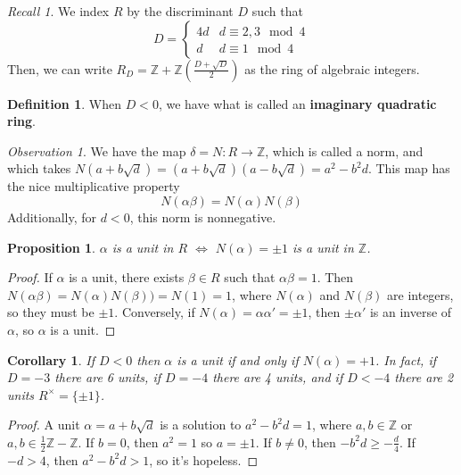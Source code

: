 \documentclass[12pt]{article}
\newtheorem{cor}[thm]{Corollary}
\newtheorem{prop}[thm]{Proposition}
\theoremstyle{definition}
\newtheorem{defn}[thm]{Definition}
\theoremstyle{remark}
\newtheorem{obs}[thm]{Observation}
\newtheorem*{rec}{Recall}
\numberwithin{equation}{section}
\newcommand\Z{\mathbb Z}    %
\newcommand\B[1]{\textbf{ #1}}
\begin{document}
\vspace{15pt}

\begin{rec}
        We index $R$ by the discriminant $D$ such that \begin{equation}
                D = \left\{\begin{array}{cc} 4d & d \equiv 2,3 \mod 4 \\ d & d \equiv 1 \mod 4 \end{array}\right.
        \end{equation}
        Then, we can write $R_D = \Z + \Z\left(\frac{D+\sqrt{D}}{2}\right)$ as the ring of algebraic integers.
\end{rec}

\vspace{15pt}

\begin{defn}
        When $D<0$, we have what is called an \B{imaginary quadratic ring}.
\end{defn}

\vspace{15pt}

\begin{obs}
        We have the map $\delta = N:R\rightarrow \Z$, which is called a norm, and which takes $N(a+b\sqrt{d}) = (a+b\sqrt{d})(a-b\sqrt{d}) = a^2-b^2d$. This map has the nice multiplicative property \begin{equation}
                N(\alpha\beta)=N(\alpha)N(\beta)
        \end{equation}
        Additionally, for $d < 0$, this norm is nonnegative.
\end{obs}

\vspace{15pt}

\begin{prop}
        $\alpha$ is a unit in $R$ $\iff$ $N(\alpha) = \pm 1$ is a unit in $\Z$.
\end{prop}
\begin{proof}
        If $\alpha$ is a unit, there exists $\beta \in R$ such that $\alpha\beta = 1$. Then $N(\alpha\beta) = N(\alpha)N(\beta)) = N(1) = 1$, where $N(\alpha)$ and $N(\beta)$ are integers, so they must be $\pm 1$. Conversely, if $N(\alpha) = \alpha\alpha' = \pm 1$, then $\pm \alpha'$ is an inverse of $\alpha$, so $\alpha$ is a unit. 
\end{proof}

\vspace{15pt}

\begin{cor}
        If $D < 0$ then $\alpha$ is a unit if and only if $N(\alpha) = +1$. In fact, if $D = -3$ there are 6 units, if $D = -4$ there are 4 units, and if $D < -4$ there are 2 units $R^{\times} = \{\pm 1\}$.
\end{cor}
\begin{proof}
        A unit $\alpha = a + b\sqrt{d}$ is a solution to $a^2-b^2d = 1$, where $a,b \in \Z$ or $a,b \in \frac{1}{2}\Z - \Z$. If $b = 0$, then $a^2 = 1$ so $a = \pm 1$. If $b \neq 0$, then $-b^2d \geq -\frac{d}{4}$. If $-d > 4$, then $a^2-b^2d > 1$, so it's hopeless.
\end{proof}
\end{document}
